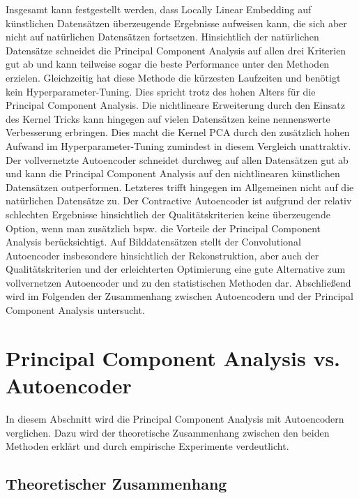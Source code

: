 Insgesamt kann festgestellt werden, dass Locally Linear Embedding auf künstlichen Datensätzen
überzeugende Ergebnisse aufweisen kann, die sich aber nicht auf natürlichen Datensätzen fortsetzen.
Hinsichtlich der natürlichen Datensätze schneidet die Principal Component Analysis auf allen drei
Kriterien gut ab und kann teilweise sogar die beste Performance unter den Methoden erzielen.
Gleichzeitig hat diese Methode die kürzesten Laufzeiten und benötigt kein Hyperparameter-Tuning.
Dies spricht trotz des hohen Alters für die Principal Component Analysis. Die nichtlineare
Erweiterung durch den Einsatz des Kernel Tricks kann hingegen auf vielen Datensätzen keine
nennenswerte Verbesserung erbringen. Dies macht die Kernel PCA durch den zusätzlich hohen Aufwand
im Hyperparameter-Tuning zumindest in diesem Vergleich unattraktiv. Der vollvernetzte Autoencoder
schneidet durchweg auf allen Datensätzen gut ab und kann die Principal Component Analysis auf den
nichtlinearen künstlichen Datensätzen outperformen. Letzteres trifft hingegen im Allgemeinen nicht
auf die natürlichen Datensätze zu. Der Contractive Autoencoder ist aufgrund der relativ schlechten
Ergebnisse hinsichtlich der Qualitätskriterien keine überzeugende Option, wenn man zusätzlich bspw.
die Vorteile der Principal Component Analysis berücksichtigt. Auf Bilddatensätzen stellt der
Convolutional Autoencoder insbesondere hinsichtlich der Rekonstruktion, aber auch der
Qualitätskriterien und der erleichterten Optimierung eine gute Alternative zum vollvernetzen
Autoencoder und zu den statistischen Methoden dar. Abschließend wird im Folgenden der Zusammenhang
zwischen Autoencodern und der Principal Component Analysis untersucht.

\section{Principal Component Analysis vs. Autoencoder}
\label{ch:Vergleich:sec:Resultate:PCA_AE}

In diesem Abschnitt wird die Principal Component Analysis mit Autoencodern verglichen. Dazu wird
der theoretische Zusammenhang zwischen den beiden Methoden erklärt und durch empirische Experimente
verdeutlicht.

\subsection{Theoretischer Zusammenhang}

